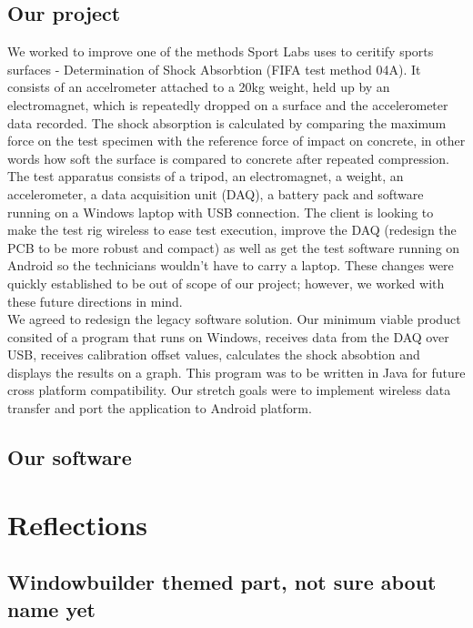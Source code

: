 \documentclass{l3proj}
\begin{document}
\subsection{Our project}
We worked to improve one of the methods Sport Labs uses to ceritify sports surfaces - Determination of Shock Absorbtion (FIFA test method 04A). It consists of an accelrometer attached to a 20kg weight, held up by an electromagnet, which is repeatedly dropped on a surface and the accelerometer data recorded. The shock absorption is calculated by comparing the maximum force on the test specimen with the reference force of impact on concrete\cite{fifa}, in other words how soft the surface is compared to concrete after repeated compression. \\
The test apparatus consists of a tripod, an electromagnet, a weight, an accelerometer, a data acquisition unit (DAQ), a battery pack and software running on a Windows laptop with USB connection. The client is looking to make the test rig wireless to ease test execution, improve the DAQ (redesign the PCB to be more robust and compact) as well as get the test software running on Android so the technicians wouldn't have to carry a laptop. These changes were quickly established to be out of scope of our project; however, we worked with these future directions in mind. \\
We agreed to redesign the legacy software solution. Our minimum viable product consited of a program that runs on Windows, receives data from the DAQ over USB, receives calibration offset values, calculates the shock absobtion and displays the results on a graph. This program was to be written in Java for future cross platform compatibility. Our stretch goals were to implement wireless data transfer and port the application to Android platform.
\subsection{Our software}

\section{Reflections}
\subsection{Windowbuilder themed part, not sure about name yet}
\end{document}
